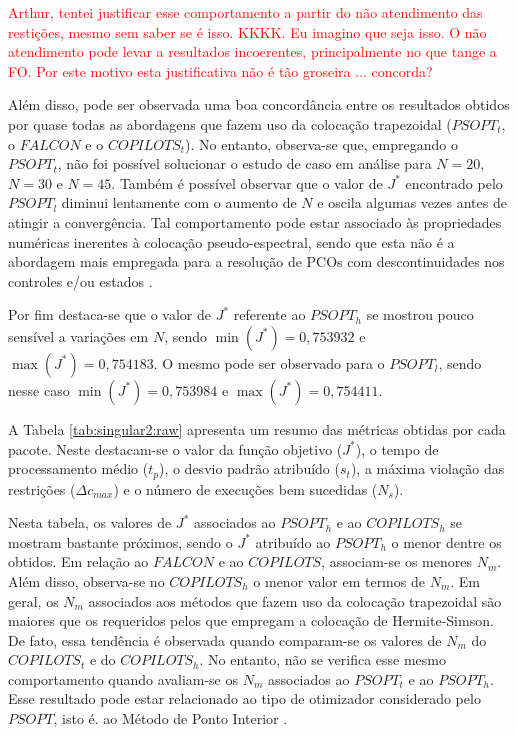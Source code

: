 \textcolor{red}{Arthur, tentei justificar esse comportamento a partir do não atendimento das restições, mesmo sem saber se é isso. KKKK. Eu imagino que seja isso. O não atendimento pode levar a resultados incoerentes, principalmente no que tange a FO. Por este motivo esta justificativa não é tão groseira ... concorda?}

Além disso, pode ser observada uma boa concordância entre os resultados obtidos por quase todas as abordagens que fazem uso da colocação trapezoidal ($ PSOPT_t $, o $ FALCON $ e o $ COPILOTS_t $). No entanto, observa-se que, empregando o $ PSOPT_t $, não foi possível solucionar o estudo de caso em análise para $ N = 20 $, $ N = 30 $ e $ N = 45 $. Também é possível observar que o valor de $ J^* $ encontrado pelo $ PSOPT_l $ diminui lentamente com o aumento de $ N $ e oscila algumas vezes antes de atingir a convergência. Tal comportamento pode estar associado às propriedades numéricas inerentes à colocação pseudo-espectral, sendo que esta não é a abordagem mais empregada para a  resolução de PCOs com descontinuidades nos controles e/ou estados \cite{becerra_tutorial_2010}. 

Por fim destaca-se que o valor de $ J^* $ referente ao $ PSOPT_h $ se mostrou pouco sensível a variações em $ N $, sendo $ \min(J^*) = 0,753932 $ e $ \max(J^*) = 0,754183$. O mesmo pode ser observado para o $ PSOPT_l $, sendo nesse caso $ \min(J^*) = 0,753984 $ e $\max(J^*) = 0,754411$. 


A  Tabela \ref{tab:singular2:raw} apresenta um resumo das métricas obtidas por cada pacote. Neste destacam-se o valor da função objetivo ($ J^* $), o tempo de processamento médio ($ t_p $), o desvio padrão atribuído ($ s_t $), a máxima violação das restrições ($ \Delta c_{max} $) e o número de execuções bem sucedidas ($ N_s $).




Nesta tabela, os valores de $ J^* $ associados ao $ PSOPT_h $ e ao $ COPILOTS_h $ se mostram bastante próximos, sendo o $ J^* $ atribuído ao $ PSOPT_h $ o menor dentre os obtidos. Em relação ao $ FALCON $ e ao $ COPILOTS $, associam-se os menores $ N_m $. Além disso, observa-se no $ COPILOTS_h $ o menor valor em termos de $ N_m $. Em geral, os $ N_m $ associados aos métodos que fazem uso da colocação trapezoidal são maiores que os requeridos pelos que empregam a colocação de  Hermite-Simson. De fato, essa tendência é observada quando comparam-se os valores de $ N_m $ do $ COPILOTS_t $ e do $ COPILOTS_h $. No entanto, não se verifica esse mesmo comportamento quando avaliam-se os $ N_m $ associados ao $ PSOPT_t $ e ao $ PSOPT_h $. Esse resultado pode estar relacionado ao tipo de otimizador considerado pelo  $ PSOPT $, isto é. ao Método de Ponto Interior \cite{wachter_implementation_2006}.

